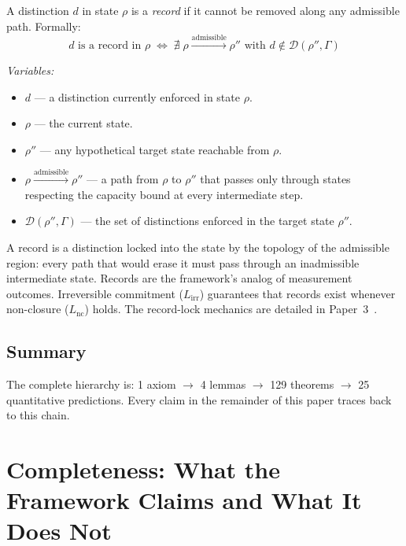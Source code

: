 \documentclass[11pt]{article}
\begin{document}
\begin{tcolorbox}[apfbox, title={Definition (Record)}]
A distinction $d$ in state $\rho$ is a \emph{record} if it cannot be removed along any admissible path.  Formally:
\begin{equation}
d \text{ is a record in } \rho \;\iff\; \nexists\; \rho \xrightarrow{\text{admissible}} \rho'' \text{ with } d \notin \mathcal{D}(\rho'',\Gamma)
\end{equation}

\smallskip\noindent\textit{Variables:}
\begin{itemize}[nosep,leftmargin=2em]
\item $d$ --- a distinction currently enforced in state $\rho$.
\item $\rho$ --- the current state.
\item $\rho''$ --- any hypothetical target state reachable from $\rho$.
\item $\rho \xrightarrow{\text{admissible}} \rho''$ --- a path from $\rho$ to $\rho''$ that passes only through states respecting the capacity bound at every intermediate step.
\item $\mathcal{D}(\rho'', \Gamma)$ --- the set of distinctions enforced in the target state $\rho''$.
\end{itemize}

\smallskip\noindent
A record is a distinction locked into the state by the topology of the admissible region: every path that would erase it must pass through an inadmissible intermediate state.  Records are the framework's analog of measurement outcomes.  Irreversible commitment ($L_{\mathrm{irr}}$) guarantees that records exist whenever non-closure ($L_{\mathrm{nc}}$) holds.  The record-lock mechanics are detailed in Paper~3~\cite{P3}.
\end{tcolorbox}


\subsection{Summary}

The complete hierarchy is: 1 axiom $\to$ 4 lemmas $\to$ 129 theorems $\to$ 25 quantitative predictions.  Every claim in the remainder of this paper traces back to this chain.


\section{Completeness: What the Framework Claims and What It Does Not}
\end{document}
